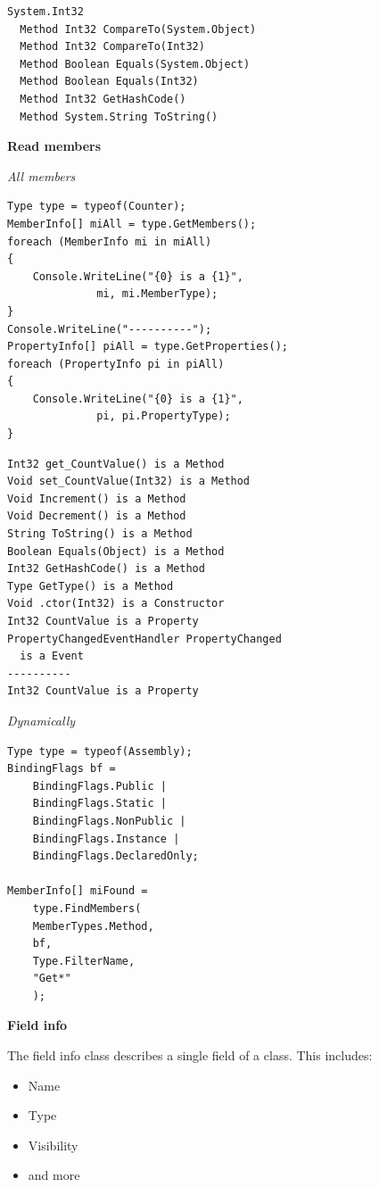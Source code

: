 \documentclass[11pt,twoside,landscape]{article}
\begin{document}
\begin{multicols}{3}
\begin{verbatim}
System.Int32
  Method Int32 CompareTo(System.Object)
  Method Int32 CompareTo(Int32)
  Method Boolean Equals(System.Object)
  Method Boolean Equals(Int32)
  Method Int32 GetHashCode()
  Method System.String ToString()
\end{verbatim}

\textbf{Read members}

\emph{All members}
\lstset{language=csharp,label= ,caption= ,captionpos=b,numbers=none}
\begin{lstlisting}
Type type = typeof(Counter);
MemberInfo[] miAll = type.GetMembers();
foreach (MemberInfo mi in miAll)
{
    Console.WriteLine("{0} is a {1}",
		      mi, mi.MemberType);
}
Console.WriteLine("----------");
PropertyInfo[] piAll = type.GetProperties();
foreach (PropertyInfo pi in piAll)
{
    Console.WriteLine("{0} is a {1}",
		      pi, pi.PropertyType);
}
\end{lstlisting}

\begin{verbatim}
Int32 get_CountValue() is a Method
Void set_CountValue(Int32) is a Method
Void Increment() is a Method
Void Decrement() is a Method
String ToString() is a Method
Boolean Equals(Object) is a Method
Int32 GetHashCode() is a Method
Type GetType() is a Method
Void .ctor(Int32) is a Constructor
Int32 CountValue is a Property
PropertyChangedEventHandler PropertyChanged
  is a Event
----------
Int32 CountValue is a Property
\end{verbatim}

\emph{Dynamically}
\lstset{language=csharp,label= ,caption= ,captionpos=b,numbers=none}
\begin{lstlisting}
Type type = typeof(Assembly);
BindingFlags bf =
    BindingFlags.Public |
    BindingFlags.Static |
    BindingFlags.NonPublic |
    BindingFlags.Instance |
    BindingFlags.DeclaredOnly;

MemberInfo[] miFound =
    type.FindMembers(
	MemberTypes.Method,
	bf,
	Type.FilterName,
	"Get*"
    );
\end{lstlisting}

\textbf{Field info}

The field info class describes a single field of a class.
This includes:
\begin{itemize}
\item Name
\item Type
\item Visibility
\item and more
\end{itemize}



\end{multicols}
\end{document}
